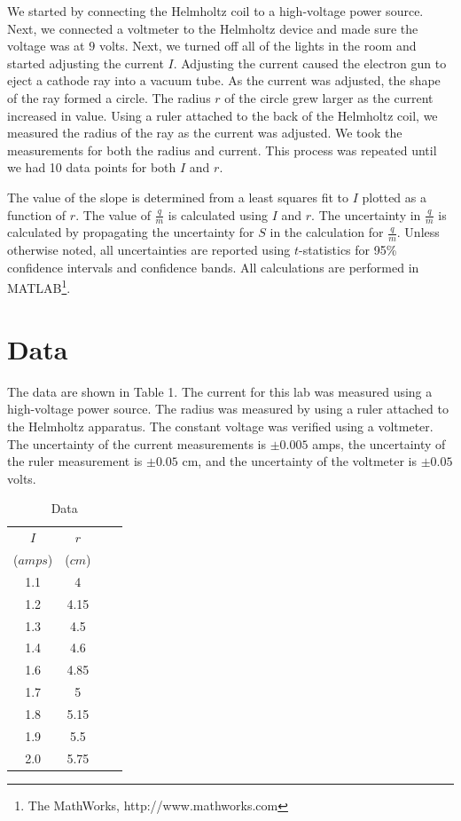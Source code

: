 \documentclass[onecolumn]{article}
\begin{document}
We started by connecting the Helmholtz coil to a high-voltage power source. Next, we connected a voltmeter to the Helmholtz device and made sure the voltage was at $9$ volts. Next, we turned off all of the lights in the room and started adjusting the current $I$. Adjusting the current caused the electron gun to eject a cathode ray into a vacuum tube. As the current was adjusted, the shape of the ray formed a circle. The radius $r$ of the circle grew larger as the current increased in value. Using a ruler attached to the back of the Helmholtz coil, we measured the radius of the ray as the current was adjusted. We took the measurements for both the radius and current. This process was repeated until we had 10 data points for both $I$ and $r$.

The value of the slope is determined from a least squares fit to $I$ plotted as a function of $r$. The value of $\frac{q}{m}$ is calculated using $I$ and $r$. The uncertainty in $\frac{q}{m}$ is calculated by propagating the uncertainty for $S$ in the calculation for $\frac{q}{m}$. Unless otherwise noted, all uncertainties are reported using $t$-statistics for 95\% confidence intervals and confidence bands. All calculations are performed in MATLAB\footnote{The MathWorks, http://www.mathworks.com}.

\section*{Data}

The data are shown in Table 1. The current for this lab was measured using a high-voltage power source. The radius was measured by using a ruler attached to the Helmholtz apparatus. The constant voltage was verified using a voltmeter. The uncertainty of the current measurements is $\pm0.005$ amps, the uncertainty of the ruler measurement is $\pm0.05$ cm, and the uncertainty of the voltmeter is $\pm0.05$ volts.

\begin{table}[htbp!]
\centering
\caption{Data}
\begin{tabular}{cccc}
\hline\hline
$I$ & $r$ \\
($amps$) & ($cm$) \\
\hline
1.1 & 4 \\
1.2 & 4.15 \\
1.3 & 4.5 \\
1.4 & 4.6 \\
1.6 & 4.85 \\
1.7 & 5 \\
1.8 & 5.15 \\
1.9 & 5.5 \\
2.0 & 5.75 \\
\hline
\end{tabular}
\end{table}
\end{document}
